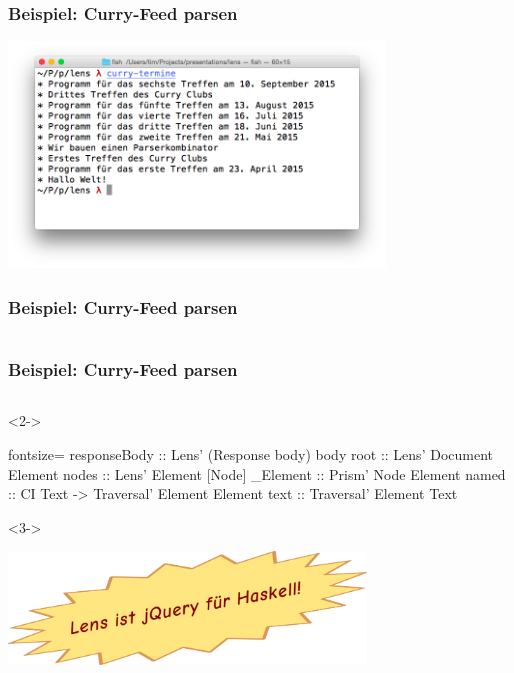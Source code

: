 \documentclass{beamer}
\begin{document}
\begin{frame}
  \frametitle{Beispiel: Curry-Feed parsen}
  \begin{center}
    \includegraphics[width=10cm]{images/curry-termine-screenshot.png}
  \end{center}
\end{frame}

\begin{frame}
  \frametitle{Beispiel: Curry-Feed parsen}
  \inputminted[fontsize=\footnotesize]{xml}{curry-feed.xml}
\end{frame}

{
\begin{frame}[fragile,b]
  \frametitle{Beispiel: Curry-Feed parsen}
  \inputminted[fontsize=\small]{haskell}{curry-termine/Main.hs}
  \begin{visibleenv}<2->
    \vspace{-7cm}
    \hfill \begin{minipage}{0.55 \linewidth}
      \begin{mdframed}[backgroundcolor=yellow]
\begin{haskellcode*}{fontsize=\footnotesize}
responseBody
  :: Lens' (Response body) body
root :: Lens' Document Element
nodes :: Lens' Element [Node]
_Element :: Prism' Node Element
named :: CI Text
      -> Traversal' Element Element
text :: Traversal' Element Text
\end{haskellcode*}
      \end{mdframed}
    \end{minipage}
  \end{visibleenv}
  \begin{visibleenv}<3->
    \vspace{-2cm}
    \begin{center}
      \includegraphics[height=3cm]{images/lens-jquery.png}
    \end{center}
    \vspace{8cm}
  \end{visibleenv}
\end{frame}
}
\end{document}
